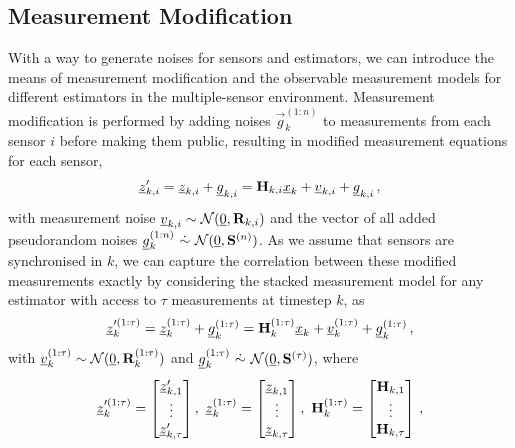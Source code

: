 \subsection{Measurement Modification}\label{subsec:priv_estimation:fus_measurement_mod}
With a way to generate noises for sensors and estimators, we can introduce the means of measurement modification and the observable measurement models for different estimators in the multiple-sensor environment. Measurement modification is performed by adding noises $\vec{g}_k^{(1:n)}$ to measurements from each sensor $i$ before making them public, resulting in modified measurement equations for each sensor,
\begin{equation}\label{eq:priv_estimation:fus_modified_measurements}
    {\underline{z}}_{k,i}^\prime = {\underline{z}}_{k,i} + {\underline{g}}_{k, i} = {{\mathbf{H}}}_{k,i}{\underline{x}}_k + {\underline{v}}_{k,i} + {\underline{g}}_{k,i}\,,
\end{equation}
with measurement noise ${\underline{v}}_{k,i}\sim\mathcal{N}({\underline{0}},{{\mathbf{R}}}_{k,i})$ and the vector of all added pseudorandom noises ${\underline{g}}_k^{(1:n)}\ \dot{\sim}\ \mathcal{N}({\underline{0}}, {{\mathbf{S}}}^{(n)})$. As we assume that sensors are synchronised in $k$, we can capture the correlation between these modified measurements exactly by considering the stacked measurement model for any estimator with access to $\tau$ measurements at timestep $k$, as
\begin{equation}\label{eq:priv_estimation:fus_measurement_equation}
    {\underline{z}}_k^{\prime(1:\tau)} = {\underline{z}}_k^{(1:\tau)} + {\underline{g}}_k^{(1:\tau)} = {{\mathbf{H}}}_k^{(1:\tau)}{\underline{x}}_k + {\underline{v}}_k^{(1:\tau)} + {\underline{g}}_k^{(1:\tau)}\,,
\end{equation}
with ${\underline{v}}_k^{(1:\tau)}\sim\mathcal{N}({\underline{0}},{{\mathbf{R}}}_k^{(1:\tau)})$ and $\vec{g}_k^{(1:\tau)}\ \dot{\sim}\ \mathcal{N}(\vec{0},\mat{S}^{(\tau)})$, where
\begin{equation*}
  \vec{z}_k^{\prime(1:\tau)}=
  \begin{bmatrix}
    \vec{z}_{k,1}^\prime\\
    \vdots\\
    \vec{z}_{k,\tau}^\prime
  \end{bmatrix},\ 
  \vec{z}_k^{(1:\tau)}=
  \begin{bmatrix}
    \vec{z}_{k,1}\\
    \vdots\\
    \vec{z}_{k,\tau}
  \end{bmatrix},\ 
  \mat{H}_k^{(1:\tau)}=
  \begin{bmatrix}
    \mat{H}_{k,1}\\
    \vdots\\
    \mat{H}_{k,\tau}\\
  \end{bmatrix}\,,
\end{equation*}
